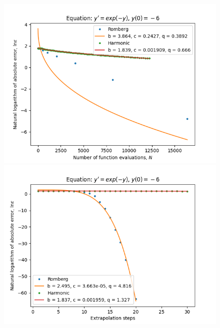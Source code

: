 \begin{figure}[H]
\centering
\begin{minipage}{0.45\textwidth}
\centering
\includegraphics[scale=0.45]{../results/emr_plots/ln_em6_hp_trend.png}
\end{minipage}
\begin{minipage}{0.45\textwidth}
\centering
\includegraphics[scale=0.45]{../results/emr_plots/ln_em6_hp_steps.png}
\end{minipage}
\end{figure}

